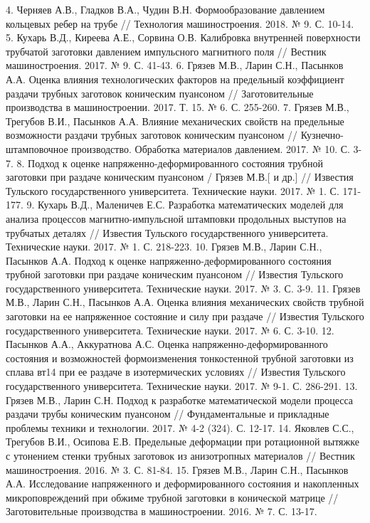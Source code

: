 4. Черняев А.В., Гладков В.А., Чудин В.Н. Формообразование давлением кольцевых ребер на трубе // Технология машиностроения. 2018. № 9. С. 10-14.
5. Кухарь В.Д., Киреева А.Е., Сорвина О.В. Калибровка внутренней поверхности трубчатой заготовки давлением импульсного магнитного поля // Вестник машиностроения. 2017. № 9. С. 41-43.
6. Грязев М.В., Ларин С.Н., Пасынков А.А. Оценка влияния технологических факторов на предельный коэффициент раздачи трубных заготовок коническим пуансоном // Заготовительные производства в машиностроении. 2017. Т. 15. № 6. С. 255-260.
7. Грязев М.В., Трегубов В.И., Пасынков А.А. Влияние механических свойств на предельные возможности раздачи трубных заготовок коническим пуансоном // Кузнечно-штамповочное производство. Обработка материалов давлением. 2017. 
№ 10. С. 3-7.
8. Подход к оценке напряженно-деформированного состояния трубной заготовки при раздаче коническим пуансоном / Грязев М.В.[ и др.] // Известия Тульского государственного университета. Технические науки. 2017. № 1. С. 171-177.
9. Кухарь В.Д., Маленичев Е.С. Разработка математических моделей для анализа процессов магнитно-импульсной штамповки продольных выступов на трубчатых деталях // Известия Тульского государственного университета. Технические науки. 2017. № 1. С. 218-223.
10. Грязев М.В., Ларин С.Н., Пасынков А.А. Подход к оценке напряженно-деформированного состояния трубной заготовки при раздаче коническим пуансоном // Известия Тульского государственного университета. Технические науки. 2017. № 3. С. 3-9.
11. Грязев М.В., Ларин С.Н., Пасынков А.А. Оценка влияния механических свойств трубной заготовки на ее напряженное состояние и силу при раздаче // 
Известия Тульского государственного университета. Технические науки. 2017. 
№ 6. С. 3-10.
12. Пасынков А.А., Аккуратнова А.С. Оценка напряженно-деформированного состояния и возможностей формоизменения тонкостенной трубной заготовки из сплава вт14 при ее раздаче в изотермических условиях // Известия Тульского государственного университета. Технические науки. 2017. № 9-1. С. 286-291.
13. Грязев М.В., Ларин С.Н. Подход к разработке математической модели процесса раздачи трубы коническим пуансоном // Фундаментальные и прикладные проблемы техники и технологии. 2017. № 4-2 (324). С. 12-17.
14. Яковлев С.С., Трегубов В.И., Осипова Е.В. Предельные деформации при ротационной вытяжке с утонением стенки трубных заготовок из анизотропных материалов // Вестник машиностроения. 2016. № 3. С. 81-84.
15. Грязев М.В., Ларин С.Н., Пасынков А.А. Исследование напряженного и деформированного состояния и накопленных микроповреждений при обжиме трубной заготовки в конической матрице // Заготовительные производства в машиностроении. 2016. № 7. С. 13-17.

\clearpage
